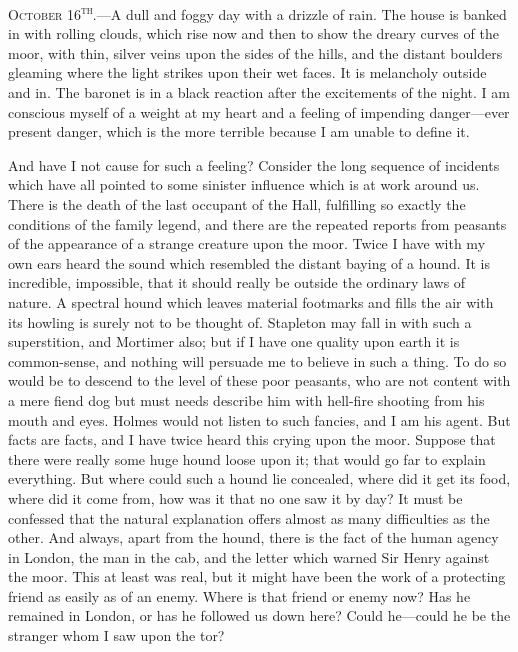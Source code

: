 \documentclass[paper=a5,BCOR=7mm,twoside,DIV=calc,12pt,usegeometry,openany,chapterprefix,endperiod,headings=big]{scrbook} %
\begin{document}
\textsc{October 16\textsuperscript{th}.}---A dull and foggy day with a drizzle of rain. The house is banked in with rolling clouds, which rise now and then to show the dreary curves of the moor, with thin, silver veins upon the sides of the hills, and the distant boulders gleaming where the light strikes upon their wet faces. It is melancholy outside and in. The baronet is in a black reaction after the excitements of the night. I am conscious myself of a weight at my heart and a feeling of impending danger---ever present danger, which is the more terrible because I am unable to define it.

And have I not cause for such a feeling? Consider the long sequence of incidents which have all pointed to some sinister influence which is at work around us. There is the death of the last occupant of the Hall, fulfilling so exactly the conditions of the family legend, and there are the repeated reports from peasants of the appearance of a strange creature upon the moor. Twice I have with my own ears heard the sound which resembled the distant baying of a hound. It is incredible, impossible, that it should really be outside the ordinary laws of nature. A spectral hound which leaves material footmarks and fills the air with its howling is surely not to be thought of. Stapleton may fall in with such a superstition, and Mortimer also; but if I have one quality upon earth it is common-sense, and nothing will persuade me to believe in such a thing. To do so would be to descend to the level of these poor peasants, who are not content with a mere fiend dog but must needs describe him with hell-fire shooting from his mouth and eyes. Holmes would not listen to such fancies, and I am his agent. But facts are facts, and I have twice heard this crying upon the moor. Suppose that there were really some huge hound loose upon it; that would go far to explain everything. But where could such a hound lie concealed, where did it get its food, where did it come from, how was it that no one saw it by day? It must be confessed that the natural explanation offers almost as many difficulties as the other. And always, apart from the hound, there is the fact of the human agency in London, the man in the cab, and the letter which warned Sir Henry against the moor. This at least was real, but it might have been the work of a protecting friend as easily as of an enemy. Where is that friend or enemy now? Has he remained in London, or has he followed us down here? Could he---could he be the stranger whom I saw upon the tor?
\end{document}
